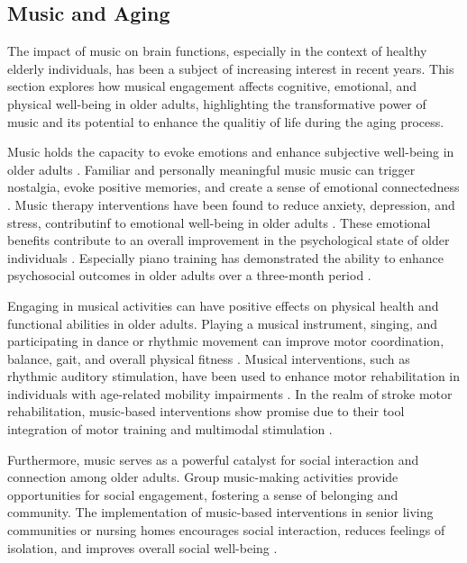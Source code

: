 \subsection{Music and Aging}

The impact of music on brain functions, especially in the context of healthy elderly individuals, has been a subject of increasing interest in recent years. This section explores how musical engagement affects cognitive, emotional, and physical well-being in older adults, highlighting the transformative power of music and its potential to enhance the qualitiy of life during the aging process.

Music holds the capacity to evoke emotions and enhance subjective well-being in older adults \cite{Croom2015}. Familiar and personally meaningful music music can trigger nostalgia, evoke positive memories, and create a sense of emotional connectedness \cite{?}. Music therapy interventions have been found to reduce anxiety, depression, and stress, contributinf to emotional well-being in older adults \cite{Guetin2013}. These emotional benefits contribute to an overall improvement in the psychological state of older individuals \cite{?}. Especially piano training has demonstrated the ability to enhance psychosocial outcomes in older adults over a three-month period \cite{Bugos2022}.

Engaging in musical activities can have positive effects on physical health and functional abilities in older adults. Playing a musical instrument, singing, and participating in dance or rhythmic movement can improve motor coordination, balance, gait, and overall physical fitness \cite{?}. Musical interventions, such as rhythmic auditory stimulation, have been used to enhance motor rehabilitation in individuals with age-related mobility impairments \cite{Thaut2015}. In the realm of stroke motor rehabilitation, music-based interventions show promise due to their tool integration of motor training and multimodal stimulation \cite{Grau-Sanchez2020}. 

Furthermore, music serves as a powerful catalyst for social interaction and connection among older adults. Group music-making activities provide opportunities for social engagement, fostering a sense of belonging and community. The implementation of music-based interventions in senior living communities or nursing homes encourages social interaction, reduces feelings of isolation, and improves overall social well-being \cite{Creech2013}.

